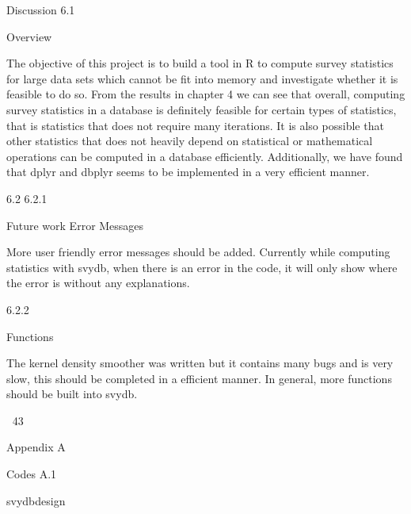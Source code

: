 Discussion
6.1

Overview

The objective of this project is to build a tool in R to compute survey statistics for
large data sets which cannot be fit into memory and investigate whether it is feasible to do so.
From the results in chapter 4 we can see that overall, computing survey statistics
in a database is definitely feasible for certain types of statistics, that is statistics that
does not require many iterations. It is also possible that other statistics that does
not heavily depend on statistical or mathematical operations can be computed in a
database efficiently. Additionally, we have found that dplyr and dbplyr seems to be
implemented in a very efficient manner.

6.2
6.2.1

Future work
Error Messages

More user friendly error messages should be added. Currently while computing
statistics with svydb, when there is an error in the code, it will only show where the
error is without any explanations.

6.2.2

Functions

The kernel density smoother was written but it contains many bugs and is very slow,
this should be completed in a efficient manner. In general, more functions should be
built into svydb.

43

Appendix A

Codes
A.1

svydbdesign


